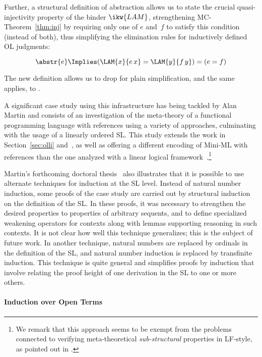 \documentclass[final]{svjour3}
\begin{document}
Further, a structural definition of abstraction allows us to state the
crucial quasi-injectivity property of the \hybrid binder $\ikw{LAM}$, 
strengthening MC-Theorem~\ref{thm:inj} by requiring only one of $e$
and~$f$ to satisfy this condition (instead of both), thus simplifying the elimination rules for inductively defined OL
judgments:
\begin{goal}
\[\abstr{e} \Implies (\LAM{x}{e\,x} = \LAM{y}{f\,y}) = (e = f) \]  
\end{goal}
The new definition allows us to drop  for plain
\HOL simplification, and the same applies, \afortiori to
.

A significant case study using this infrastructure has being tackled
by Alan Martin \cite{MartinCase,MartinPhD2010} and consists of an
investigation of the meta-theory of a functional programming language
with references using a variety of approaches, culminating with the
usage of a linearly ordered SL\@.  This study extends the work in
Section~\ref{sec:olli} and~\cite{MomiglianoP03}, as well as offering a
different encoding of Mini-ML with references than the one analyzed
with a linear logical framework~\cite{CervesatoP02}.\footnote{We
remark that this approach seems to be exempt from the problems
connected to verifying meta-theoretical \emph{sub-structural}
properties in LF-style, as pointed out in \cite{Reed08}.}

Martin's forthcoming doctoral thesis~\cite{MartinPhD2010} also
illustrates that it is possible to use alternate techniques for
induction at the SL level.  Instead of natural number induction, some
proofs of the case study are carried out by structural induction on
the definition of the SL\@.  In these proofs, it was necessary to
strengthen the desired properties to properties of arbitrary sequents,
and to define specialized weakening operators for contexts along with
lemmas supporting reasoning in such contexts.  It is not clear how
well this technique generalizes; this is the subject of future work.
In another technique, natural numbers are replaced by ordinals in the
definition of the SL, and natural number induction is replaced by
transfinite induction.  This technique is quite general and simplifies
proofs by induction that involve relating the proof height of one
derivation in the SL to one or more others.


\paragraph{Induction over Open Terms}
\end{document}

